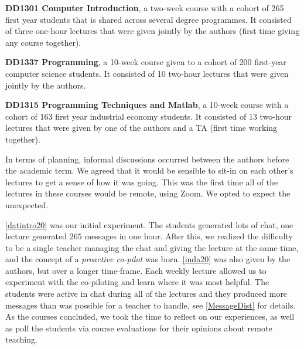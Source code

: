 \documentclass[sigconf,natbib=false]{acmart}
\begin{document}
\begin{courses}
  \item\label{datintro20} \textbf{DD1301 Computer Introduction}, a two-week 
    course with a cohort of 265 first year students that is shared across 
    several degree programmes. It consisted of three one-hour lectures that 
    were given jointly by the authors (first time giving any course together).

  \item\label{inda20} \textbf{DD1337 Programming}, a 10-week course given to a 
    cohort of 200 first-year computer science students. It consisted of 10 
    two-hour lectures that were given jointly by the authors.

  \item\label{prgi20} \textbf{DD1315 Programming Techniques and Matlab}, a 
    10-week course with a cohort of 163 first year industrial economy students. 
    It consisted of 13 two-hour lectures that were given by one of the authors 
    and a \ac{TA} (first time working together).
\end{courses}

In terms of planning, informal discussions occurred between the authors before 
the academic term. We agreed that it would be sensible to sit-in on each 
other's lectures to get a sense of how it was going. This was the first time 
all of the lectures in these courses would be remote, using Zoom. We opted to 
expect the unexpected.

\ref{datintro20} was our initial experiment. The students generated lots of 
chat, \eg one lecture generated $265$ messages in one hour. After this, we 
realized the difficulty to be a single teacher managing the chat and giving the 
lecture at the same time, and the concept of a \emph{proactive co-pilot} was 
born. \ref{inda20} was also given by the authors, but over a longer time-frame. 
Each weekly lecture allowed us to experiment with the co-piloting and learn 
where it was most helpful. The students were active in chat during all of the 
lectures and they produced more messages than was possible for a teacher to 
handle, see \cref{MessageDist} for details. As the courses concluded, we took 
the time to reflect on our experiences, as well as poll the students via course 
evaluations for their opinions about remote teaching.
\end{document}
